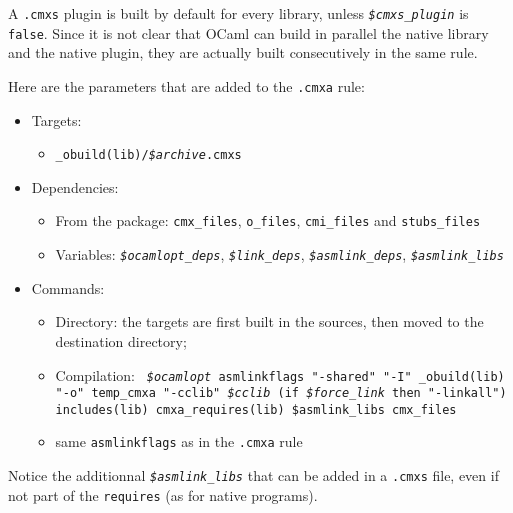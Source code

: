 A {\tt .cmxs} plugin is built by default for every library, unless
{\tt\em \$cmxs\_plugin} is {\tt false}. Since it is not clear that
OCaml can build in parallel the native library and the native plugin,
they are actually built consecutively in the same rule.

Here are the parameters that are added to the {\tt .cmxa} rule:
\begin{itemize}
\item Targets:
\begin{itemize}
\item {\tt \_obuild(lib)/{\em \$archive}.cmxs}
\end{itemize}
\item Dependencies:
\begin{itemize}
\item From the package: {\tt cmx\_files}, {\tt o\_files},
  {\tt cmi\_files} and {\tt stubs\_files}
\item Variables: {\tt\em \$ocamlopt\_deps},  {\tt\em \$link\_deps},
      {\tt\em \$asmlink\_deps}, {\tt\em \$asmlink\_libs}
\end{itemize}
\item Commands:
  \begin{itemize}
    \item Directory: the targets are first built in the sources, then
      moved to the destination directory;
    \item Compilation: {\tt
      {\em \$ocamlopt} asmlinkflags "-shared"
      "-I" \_obuild(lib) "-o" temp\_cmxa
      "-cclib" {\em \$cclib} (if {\em \$force\_link} then "-linkall")
      includes(lib) cmxa\_requires(lib) 
      \$asmlink\_libs cmx\_files
    }
    \item same {\tt asmlinkflags} as in the {\tt .cmxa} rule
  \end{itemize} 
\end{itemize}

Notice the additionnal {\tt\em \$asmlink\_libs} that can be added in a
{\tt .cmxs} file, even if not part of the {\tt requires} (as for
native programs).

